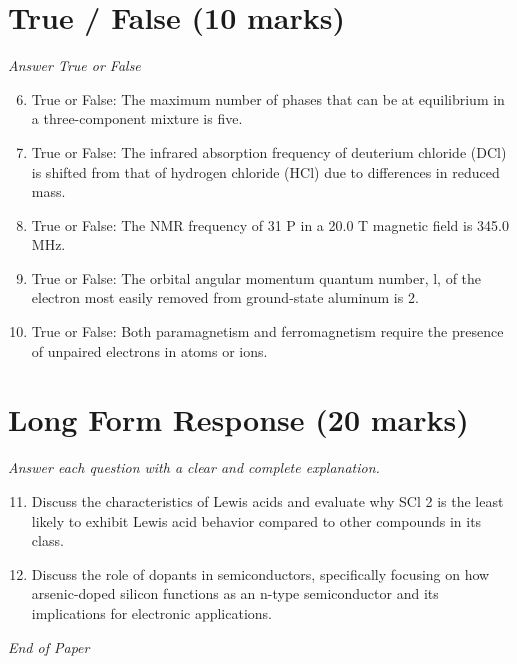\documentclass[12pt]{article}
\begin{document}
\section*{True / False (10 marks)}
\textit{Answer True or False}
\begin{enumerate}[label=\arabic*.]
\setcounter{enumi}{5}
\item True or False: The maximum number of phases that can be at equilibrium in a three-component mixture is five.
\item True or False: The infrared absorption frequency of deuterium chloride (DCl) is shifted from that of hydrogen chloride (HCl) due to differences in reduced mass.
\item True or False: The NMR frequency of 31 P in a 20.0 T magnetic field is 345.0 MHz.
\item True or False: The orbital angular momentum quantum number, l, of the electron most easily removed from ground-state aluminum is 2.
\item True or False: Both paramagnetism and ferromagnetism require the presence of unpaired electrons in atoms or ions.
\end{enumerate}

\section*{Long Form Response (20 marks)}
\textit{Answer each question with a clear and complete explanation.}
\begin{enumerate}[label=\arabic*.]
\setcounter{enumi}{10}
\item Discuss the characteristics of Lewis acids and evaluate why SCl 2 is the least likely to exhibit Lewis acid behavior compared to other compounds in its class.
\item Discuss the role of dopants in semiconductors, specifically focusing on how arsenic-doped silicon functions as an n-type semiconductor and its implications for electronic applications.
\end{enumerate}

\vfill
\noindent\textit{End of Paper}
\end{document}
